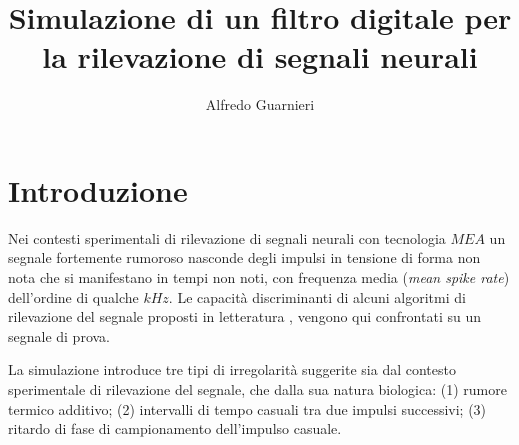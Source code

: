 \documentclass[9pt,twocolumn,twoside]{osajnl}
\title{Simulazione di un filtro digitale per la rilevazione di segnali neurali \emph{ }}
\author[1]{Alfredo Guarnieri}
\begin{document}
\maketitle



\section{Introduzione}

Nei contesti sperimentali di rilevazione di segnali neurali con tecnologia $MEA$ un segnale fortemente rumoroso nasconde degli impulsi in tensione di forma non nota che si manifestano in tempi non noti, con frequenza media
({\it mean spike rate}) dell'ordine di qualche $kHz$. Le capacità discriminanti di alcuni algoritmi di rilevazione del segnale proposti in letteratura
\cite{Vallicelli2017}, \cite{Lambacher2011} vengono qui confrontati su un segnale di prova.

La simulazione introduce tre tipi di irregolarità suggerite sia dal contesto sperimentale di rilevazione del segnale, che dalla sua natura biologica: (1) rumore termico additivo; (2) intervalli di tempo casuali tra due impulsi successivi; (3) ritardo di fase di campionamento dell'impulso casuale.
\end{document}
